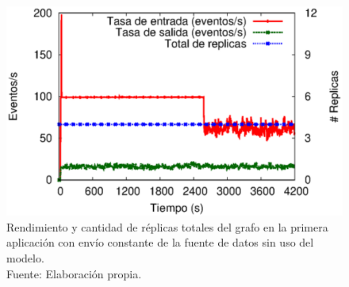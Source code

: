\begin{figure}[!ht]
	\centering
	\captionsetup{justification=centering}
	\includegraphics[scale=0.65]{images/exp/app1/uniform/sm/processSystem.eps}
    \caption[Rendimiento y cantidad de r\'eplicas totales del grafo en la primera aplicaci\'on con env\'io constante de la fuente de datos sin uso del modelo.]{Rendimiento y cantidad de r\'eplicas totales del grafo en la primera aplicaci\'on con env\'io constante de la fuente de datos sin uso del modelo.\\Fuente: Elaboraci\'on propia.}
	\label{fig:app1-uniform-processSystem-sm}
\end{figure}



